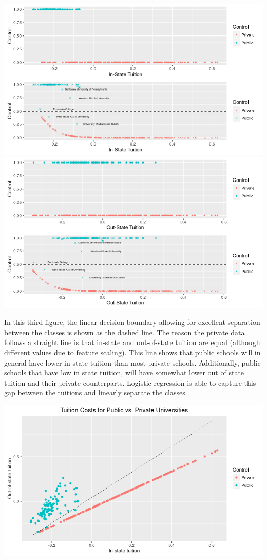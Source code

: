 \documentclass[10pt]{article}
\begin{document}
\includegraphics[width=\textwidth]{figures/test-tuition-control1}
\includegraphics[width=\textwidth]{figures/test-tuition-control2}

In this third figure, the linear decision boundary allowing for excellent separation between the classes is shown as the dashed line. The reason the private data follows a straight line is that in-state and out-of-state tuition are equal (although different values due to feature scaling). This line shows that public schools will in general have lower in-state tuition than most private schools. Additionally, public schools that have low in state tuition, will have somewhat lower out of state tuition and their private counterparts. Logistic regression is able to capture this gap between the tuitions and linearly separate the classes.

\includegraphics[width=\textwidth]{figures/test-tuition-control3}
\end{document}
